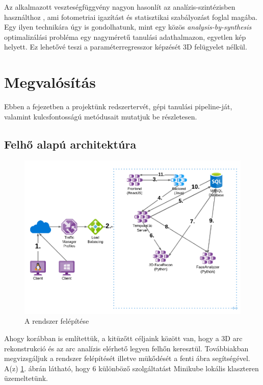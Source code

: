 \documentclass[12pt,a4]{article}
\begin{document}
	
	Az alkalmazott veszteségfüggvény nagyon hasonlít az analízis-szintézisben használthoz \cite{3dmm}, ami fotometriai igazítást és statisztikai szabályozást foglal magába. Egy ilyen technikára úgy is gondolhatunk, mint egy közös
	\textit{analysis-by-synthesis} optimalizálási probléma egy nagyméretű tanulási
	adathalmazon, egyetlen kép helyett. Ez lehetővé teszi a paraméterregresszor képzését 3D felügyelet nélkül.
	
	\newpage
	\section{Megvalósítás}
	
	Ebben a fejezetben a projektünk redszertervét, gépi tanulási pipeline-ját, valamint kulcsfontosságú metódusait mutatjuk be részletesen.
	
	\subsection{Felhő alapú architektúra}
	
	\begin{figure}[h]	
		\centering
		\includegraphics[width=1\linewidth]{sysplan}
		\caption{ A rendszer felépítése}
	   \label{fig:sysplan}
 \end{figure}

	Ahogy korábban is említettük, a kitüzőtt céljaink között van, hogy a
	3D arc rekonstrukció és az arc analízis elérhető legyen felhőn keresztül.
	Továbbiakban megvizsgáljuk a rendszer felépítését illetve mükődését a
	fenti ábra segítségével. A(z) \ref{fig:sysplan}. ábrán látható, hogy 6 különböző szolgáltatást
	Minikube lokális klaszteren üzemeltetünk.
\end{document}
